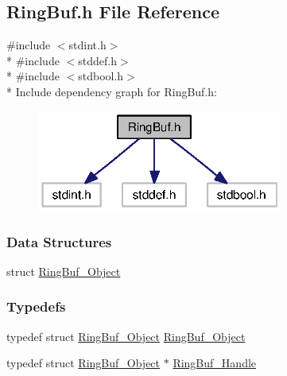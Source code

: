 \subsection{Ring\+Buf.\+h File Reference}
\label{_ring_buf_8h}
{\ttfamily \#include $<$stdint.\+h$>$}\\*
{\ttfamily \#include $<$stddef.\+h$>$}\\*
{\ttfamily \#include $<$stdbool.\+h$>$}\\*
Include dependency graph for Ring\+Buf.\+h\+:
\nopagebreak
\begin{figure}[H]
\begin{center}
\leavevmode
\includegraphics[width=229pt]{_ring_buf_8h__incl}
\end{center}
\end{figure}
\subsubsection*{Data Structures}
\begin{DoxyCompactItemize}
\item 
struct \hyperlink{struct_ring_buf___object}{Ring\+Buf\+\_\+\+Object}
\end{DoxyCompactItemize}
\subsubsection*{Typedefs}
\begin{DoxyCompactItemize}
\item 
typedef struct \hyperlink{struct_ring_buf___object}{Ring\+Buf\+\_\+\+Object} \hyperlink{_ring_buf_8h_af6920ef38868fbc57971fdbbab477d0d}{Ring\+Buf\+\_\+\+Object}
\item 
typedef struct \hyperlink{struct_ring_buf___object}{Ring\+Buf\+\_\+\+Object} $\ast$ \hyperlink{_ring_buf_8h_ade97ef8496bcec2a38a8695128458883}{Ring\+Buf\+\_\+\+Handle}
\end{DoxyCompactItemize}
